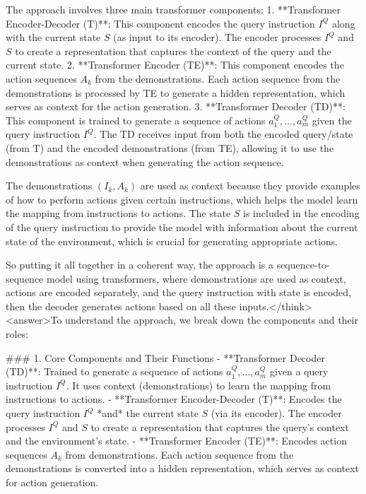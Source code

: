 The approach involves three main transformer components:
1. **Transformer Encoder-Decoder (T)**: This component encodes the query instruction \( I^Q \) along with the current state \( S \) (as input to its encoder). The encoder processes \( I^Q \) and \( S \) to create a representation that captures the context of the query and the current state.
2. **Transformer Encoder (TE)**: This component encodes the action sequences \( A_k \) from the demonstrations. Each action sequence from the demonstrations is processed by TE to generate a hidden representation, which serves as context for the action generation.
3. **Transformer Decoder (TD)**: This component is trained to generate a sequence of actions \( a^Q_1, \dots, a^Q_m \) given the query instruction \( I^Q \). The TD receives input from both the encoded query/state (from T) and the encoded demonstrations (from TE), allowing it to use the demonstrations as context when generating the action sequence.

The demonstrations \( (I_k, A_k) \) are used as context because they provide examples of how to perform actions given certain instructions, which helps the model learn the mapping from instructions to actions. The state \( S \) is included in the encoding of the query instruction to provide the model with information about the current state of the environment, which is crucial for generating appropriate actions.

So putting it all together in a coherent way, the approach is a sequence-to-sequence model using transformers, where demonstrations are used as context, actions are encoded separately, and the query instruction with state is encoded, then the decoder generates actions based on all these inputs.</think><answer>To understand the approach, we break down the components and their roles:  


### 1. Core Components and Their Functions  
- **Transformer Decoder (TD)**: Trained to generate a sequence of actions \( a^Q_1, \dots, a^Q_m \) given a query instruction \( I^Q \). It uses context (demonstrations) to learn the mapping from instructions to actions.  
- **Transformer Encoder-Decoder (T)**: Encodes the query instruction \( I^Q \) *and* the current state \( S \) (via its encoder). The encoder processes \( I^Q \) and \( S \) to create a representation that captures the query’s context and the environment’s state.  
- **Transformer Encoder (TE)**: Encodes action sequences \( A_k \) from demonstrations. Each action sequence from the demonstrations is converted into a hidden representation, which serves as context for action generation.  


